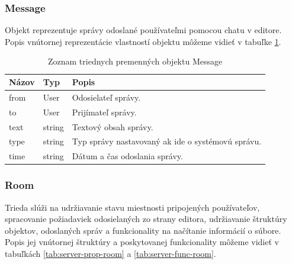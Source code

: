 \subsubsection{Message}
Objekt  reprezentuje správy odoslané používateľmi pomocou chatu v editore. Popis vnútornej reprezentácie vlastností objektu môžeme vidieť v tabuľke \ref{tab:server-prop-message}.

\begin{table}
	\begin{tabular}{ | m{3cm} | m{3cm}| m{6.5cm} | } \hline
		\textbf{Názov} & \textbf{Typ} & \textbf{Popis} \\ \hline \hline
		
		from & User & Odosielateľ správy. \\\hline
		to & User & Prijímateľ správy. \\\hline
		text & string & Textový obsah správy. \\\hline
		type & string & Typ správy nastavovaný ak ide o systémovú správu. \\\hline
		time & string & Dátum a čas odoslania správy. \\	\hline
	
		\hline
	\end{tabular}
	\caption{Zoznam triednych premenných objektu Message}
	\label{tab:server-prop-message}
\end{table}



\subsubsection{Room}
Trieda  slúži na udržiavanie stavu miestnosti pripojených používateľov, spracovanie požiadaviek odosielaných zo strany editora, udržiavanie štruktúry objektov, odoslaných správ a funkcionality na načítanie informácií o súbore. Popis jej vnútornej štruktúry a poskytovanej funkcionality môžeme vidieť v tabuľkách \ref{tab:server-prop-room} a \ref{tab:server-func-room}.

